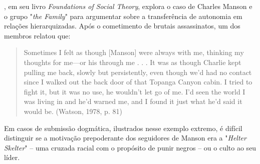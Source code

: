 \documentclass[
12pt,				%
openright,			%
twoside,			%
a4paper,			%
english,			%
french,				%
spanish,			%
brazil				%
]{abntex2}
\begin{document}
, em seu livro \emph{Foundations of Social Theory}, explora o caso de Charles Manson e o grupo "\emph{the Family}" para argumentar sobre a transferência de autonomia em relações hierarquizadas. Após o cometimento de brutais assassinatos, um dos membros relatou que:

\begin{quote}
	Sometimes I felt as though [Manson] were always with me, thinking my thoughts for me—or his through me . . . It was as though Charlie kept pulling me back, slowly but persistently, even though we’d had no contact since I walked out the back door of that Topanga Canyon cabin. I tried to fight it, but it was no use, he wouldn’t let go of me. I’d seen the world I was living in and he’d warned me, and I found it just what he’d said it would be. (Watson, 1978, p. 81)
\end{quote}

Em casos de submissão dogmática, ilustrados nesse exemplo extremo, é difícil distinguir se a motivação prepoderante dos seguidores de Manson era a "\emph{Helter Skelter}" -- uma cruzada racial com o propósito de punir negros -- ou o culto ao seu líder.
\end{document}
